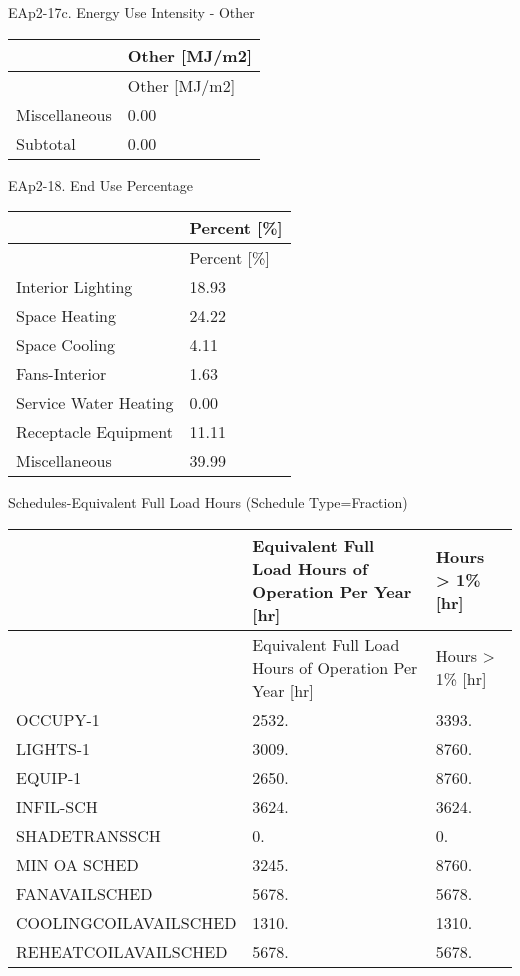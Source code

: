 EAp2-17c. Energy Use Intensity - Other

\begin{longtable}[c]{@{}ll@{}}
\toprule 
 & Other [MJ/m2] \tabularnewline
\midrule
\endfirsthead

\toprule 
 & Other [MJ/m2] \tabularnewline
\midrule
\endhead

Miscellaneous & 0.00 \tabularnewline
Subtotal & 0.00 \tabularnewline
\bottomrule
\end{longtable}

EAp2-18. End Use Percentage

\begin{longtable}[c]{@{}ll@{}}
\toprule 
 & Percent [\%] \tabularnewline
\midrule
\endfirsthead

\toprule 
 & Percent [\%] \tabularnewline
\midrule
\endhead

Interior Lighting & 18.93 \tabularnewline
Space Heating & 24.22 \tabularnewline
Space Cooling & 4.11 \tabularnewline
Fans-Interior & 1.63 \tabularnewline
Service Water Heating & 0.00 \tabularnewline
Receptacle Equipment & 11.11 \tabularnewline
Miscellaneous & 39.99 \tabularnewline
\bottomrule
\end{longtable}

Schedules-Equivalent Full Load Hours (Schedule Type=Fraction)
\begin{longtable}[c]{@{}lll@{}}

\toprule 
 & Equivalent Full Load Hours of Operation Per Year [hr] & Hours > 1\% [hr] \tabularnewline
\midrule
\endfirsthead

\toprule 
 & Equivalent Full Load Hours of Operation Per Year [hr] & Hours > 1\% [hr] \tabularnewline
\midrule
\endhead

    OCCUPY-1              &        2532.                                          &        3393.     \tabularnewline
    LIGHTS-1              &        3009.                                          &        8760.     \tabularnewline
    EQUIP-1               &        2650.                                          &        8760.     \tabularnewline
    INFIL-SCH             &        3624.                                          &        3624.     \tabularnewline
    SHADETRANSSCH         &           0.                                          &           0.     \tabularnewline
    MIN OA SCHED          &        3245.                                          &        8760.     \tabularnewline
    FANAVAILSCHED         &        5678.                                          &        5678.     \tabularnewline
    COOLINGCOILAVAILSCHED &        1310.                                          &        1310.     \tabularnewline
    REHEATCOILAVAILSCHED  &        5678.                                          &        5678.     \tabularnewline

\bottomrule
\end{longtable}

